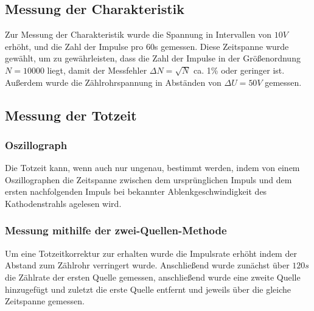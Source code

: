 \documentclass{scrartcl}
\begin{document}
\subsection{Messung der Charakteristik}
Zur Messung der Charakteristik wurde die Spannung in Intervallen von $10 V$ erhöht, und die Zahl der Impulse pro 60s gemessen. Diese Zeitspanne wurde gewählt, um zu gewährleisten, dass die Zahl der Impulse in der Größenordnung $N=10000$  liegt, damit der Messfehler $\Delta N=\sqrt{N}$ ca. 1\% oder geringer ist. Außerdem wurde die Zählrohrspannung in Abständen von $\Delta U=50 V$ gemessen.
\subsection{Messung der Totzeit}
\subsubsection{Oszillograph}
Die Totzeit kann, wenn auch nur ungenau, bestimmt werden, indem von einem Oszillographen die Zeitspanne zwischen dem ursprünglichen Impuls und dem ersten nachfolgenden Impuls bei bekannter Ablenkgeschwindigkeit des Kathodenstrahls agelesen wird.
\subsubsection{Messung mithilfe der zwei-Quellen-Methode}
Um eine Totzeitkorrektur zur erhalten wurde die Impulsrate erhöht indem der Abstand zum Zählrohr verringert wurde. Anschließend wurde zunächst über $120 s$  die Zählrate der ersten Quelle gemessen, anschließend wurde eine zweite Quelle hinzugefügt und zuletzt die erste Quelle entfernt und jeweils über die gleiche Zeitspanne gemessen.
\end{document}
